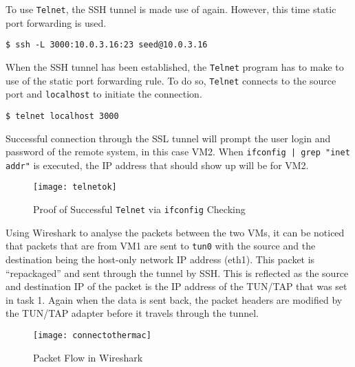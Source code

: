 \documentclass[a4paper,12pt]{article}
\begin{document}
\noindent To use \texttt{Telnet}, the SSH tunnel is made use of again. However, this time static port forwarding is used.
\begin{verbatim}
$ ssh -L 3000:10.0.3.16:23 seed@10.0.3.16
\end{verbatim}
When the SSH tunnel has been established, the \texttt{Telnet} program has to make to use of the static port forwarding rule. To do so, \texttt{Telnet} connects to the source port and \texttt{localhost} to initiate the connection.
\begin{verbatim}
$ telnet localhost 3000
\end{verbatim}
Successful connection through the SSL tunnel will prompt the user login and password of the remote system, in this case VM2. When \texttt{ifconfig | grep "inet addr"} is executed, the IP address that should show up will be for VM2.
\begin{figure}[H]
\centering
\texttt{[image: telnetok]}
\caption{Proof of Successful \texttt{Telnet} via \texttt{ifconfig} Checking}
\label{fig:telnetok}
\end{figure}
\noindent
Using Wireshark to analyse the packets between the two VMs, it can be noticed that packets that are from VM1 are sent to \texttt{tun0} with the source and the destination being the host-only network IP address (eth1). This packet is ``repackaged'' and sent through the tunnel by SSH. This is reflected as the source and destination IP of the packet is the IP address of the TUN/TAP that was set in task 1. Again when the data is sent back, the packet headers are modified by the TUN/TAP adapter before it travels through the tunnel.
\begin{figure}[H]
\centering
\texttt{[image: connectothermac]}
\caption{Packet Flow in Wireshark}
\label{fig:connectothermac}
\end{figure}

\end{document}
